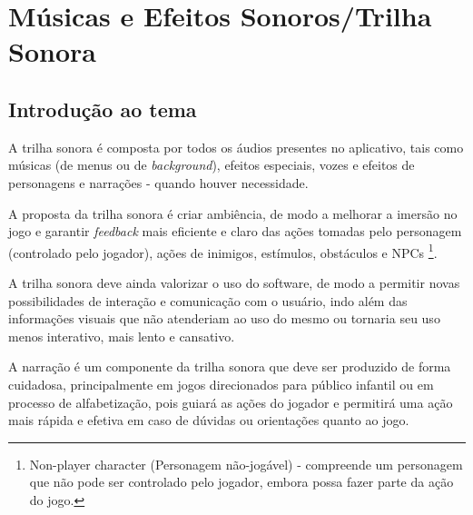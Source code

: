 \section{Músicas e Efeitos Sonoros/Trilha Sonora}

\subsection{Introdução ao tema}
A trilha sonora  é composta por todos os áudios presentes no aplicativo, tais como músicas (de menus ou de \textit{background}), efeitos especiais, vozes e efeitos de personagens e narrações - quando houver necessidade.

A proposta da trilha sonora é criar ambiência, de modo a melhorar a imersão no jogo e garantir \textit{feedback} mais eficiente e claro das ações tomadas pelo personagem (controlado pelo jogador), ações de inimigos, estímulos, obstáculos e NPCs \footnote{Non-player character (Personagem não-jogável) - compreende um personagem que não pode ser controlado pelo jogador, embora possa fazer parte da ação do jogo.}. 
 
A trilha sonora deve ainda valorizar o uso do software, de modo a permitir novas possibilidades de interação e comunicação com o usuário, indo além das informações visuais que não atenderiam ao uso do mesmo ou tornaria seu uso menos interativo, mais lento e cansativo.

A narração é um componente da trilha sonora que deve ser produzido de forma cuidadosa, principalmente em jogos direcionados para público infantil ou em processo de alfabetização, pois guiará as ações do jogador e permitirá uma ação mais rápida e efetiva em caso de dúvidas ou orientações quanto ao jogo.

